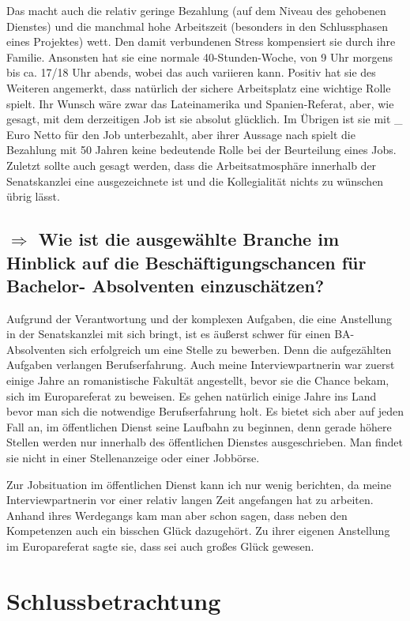 \documentclass[12pt,headsepline,a4paper]{scrartcl}
\newcommand\quest[1]{\subsection*{$\Rightarrow$ #1}}
\begin{document}
Das macht auch die relativ geringe Bezahlung (auf dem Niveau des gehobenen Dienstes) und die manchmal hohe Arbeitszeit (besonders in den Schlussphasen eines Projektes)  wett. Den damit verbundenen Stress kompensiert sie durch ihre Familie. Ansonsten hat sie eine  normale 40-Stunden-Woche, von 9 Uhr morgens bis ca. 17/18 Uhr abends, wobei das auch variieren kann.
Positiv hat sie des Weiteren angemerkt, dass natürlich der sichere Arbeitsplatz eine wichtige Rolle spielt.
Ihr Wunsch wäre zwar das Lateinamerika und Spanien-Referat, aber, wie gesagt, mit dem derzeitigen Job ist sie absolut glücklich. 
Im Übrigen ist sie mit \_ Euro Netto für den Job unterbezahlt, aber ihrer Aussage nach spielt die Bezahlung mit 50 Jahren keine bedeutende Rolle bei der Beurteilung eines Jobs.
Zuletzt sollte auch gesagt werden, dass die Arbeitsatmosphäre innerhalb der Senatskanzlei eine ausgezeichnete ist und die Kollegialität nichts zu wünschen übrig lässt.

\quest{Wie ist die ausgewählte Branche im Hinblick auf die Beschäftigungschancen für Bachelor- Absolventen einzuschätzen?}
Aufgrund der Verantwortung und der komplexen Aufgaben, die eine Anstellung in der Senatskanzlei mit sich bringt, ist es äußerst schwer für einen BA- Absolventen sich erfolgreich um eine Stelle zu bewerben.
Denn die aufgezählten Aufgaben verlangen Berufserfahrung. Auch meine Interviewpartnerin war zuerst einige Jahre an romanistische Fakultät angestellt, bevor sie die Chance bekam, sich im Europareferat zu beweisen. Es gehen natürlich einige Jahre ins Land  bevor man sich die notwendige Berufserfahrung holt. Es bietet sich aber auf jeden Fall an, im öffentlichen Dienst seine Laufbahn zu beginnen, denn gerade höhere Stellen werden nur innerhalb des öffentlichen Dienstes ausgeschrieben. Man findet sie nicht in einer Stellenanzeige oder einer Jobbörse.

Zur Jobsituation im öffentlichen Dienst kann ich nur wenig berichten, da meine Interviewpartnerin vor einer relativ langen Zeit angefangen hat zu arbeiten. Anhand ihres Werdegangs kam man aber schon sagen, dass neben den Kompetenzen auch ein bisschen Glück dazugehört. Zu ihrer eigenen Anstellung im Europareferat sagte sie, dass sei auch großes Glück gewesen.  


\section{Schlussbetrachtung}
\end{document}
